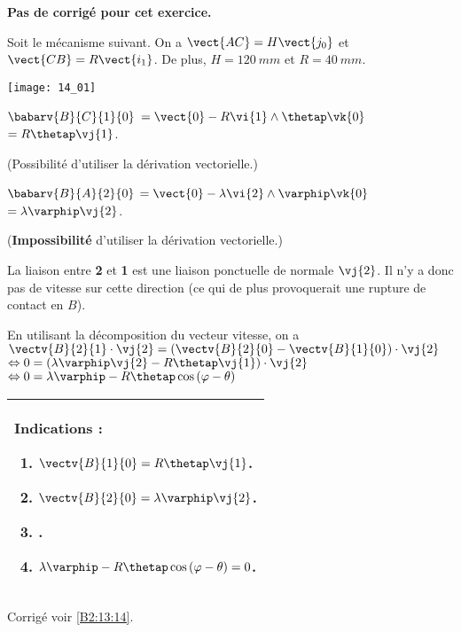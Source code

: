 \normalfalse \difficiletrue \tdifficilefalse
\correctiontrue


\setcounter{numques}{0}
\ifcorrection
\else
\textbf{Pas de corrigé pour cet exercice.}
\fi

\ifprof
\else
Soit le mécanisme suivant. On a $\vect{AC}=H\vect{j_0}$ et $\vect{CB}=R\vect{i_1}$. De plus, 
$H=\SI{120}{mm}$ et $R=\SI{40}{mm}$. 

\begin{center}
\texttt{[image: 14\_01]}
\end{center}
\fi


\ifprof
$\babarv{B}{C}{1}{0}$ 
$=\vect{0}-R\vi{1}\wedge\thetap\vk{0}$
$=R\thetap\vj{1}$.

(Possibilité d'utiliser la dérivation vectorielle.)

\else
\fi

\ifprof
$\babarv{B}{A}{2}{0}$ 
$=\vect{0}-\lambda \vi{2}\wedge\varphip\vk{0}$
$=\lambda\varphip\vj{2}$.

(\textbf{Impossibilité} d'utiliser la dérivation vectorielle.)

\else
\fi

\ifprof
La liaison entre \textbf{2} et \textbf{1} est une liaison ponctuelle de normale $\vj{2}$. Il n'y a donc pas de vitesse sur cette direction (ce qui de plus provoquerait une rupture de contact en $B$). 
\else
\fi

\ifprof
En utilisant la décomposition du vecteur vitesse, on a
$\vectv{B}{2}{1}\cdot \vj{2} =\left( \vectv{B}{2}{0} - \vectv{B}{1}{0}\right) \cdot \vj{2}$
$ \Leftrightarrow {0} =\left( \lambda\varphip\vj{2} - R\thetap\vj{1}\right) \cdot \vj{2}$
$ \Leftrightarrow {0} = \lambda\varphip - R\thetap \cos \left( \varphi - \theta\right)$

\else
\fi





\ifprof
\else
\footnotesize
\ifcolle
\else
\begin{center}
\begin{tabular}{|p{.9\linewidth}|}
\hline
Indications :
\begin{enumerate}
\item $\vectv{B}{1}{0}=R\thetap\vj{1}$.
\item $\vectv{B}{2}{0}=\lambda\varphip\vj{2}$.
\item .
\item $ \lambda\varphip - R\thetap \cos \left( \varphi - \theta\right)=0$.
\end{enumerate} \\ \hline
\end{tabular}
\end{center}
\fi
\normalsize

\begin{flushright}
\footnotesize{Corrigé  voir \ref{B2:13:14}.}
\end{flushright}%
\fi
